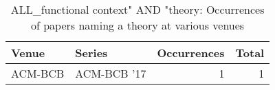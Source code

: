 \begin{table*}[t]
\begin{tabular}{llrr}
Venue & Series & Occurrences & Total\\\hline
\multirow{1}{*}{ACM-BCB } & ACM-BCB '17 & 1 & \multirow{1}{*}{1}\\
\end{tabular}
\caption{ALL\_functional context" AND "theory: Occurrences of papers naming a theory at various venues}
\end{table*}
